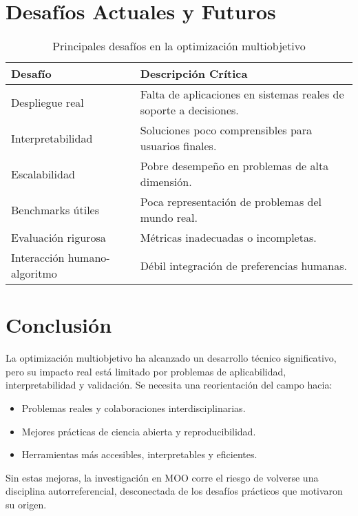 \documentclass[12pt]{article}
\begin{document}
\section*{Desafíos Actuales y Futuros}

\begin{table}[h!]
\centering
\begin{tabular}{@{}ll@{}}
\toprule
\textbf{Desafío} & \textbf{Descripción Crítica} \\
\midrule
Despliegue real & Falta de aplicaciones en sistemas reales de soporte a decisiones. \\
Interpretabilidad & Soluciones poco comprensibles para usuarios finales. \\
Escalabilidad & Pobre desempeño en problemas de alta dimensión. \\
Benchmarks útiles & Poca representación de problemas del mundo real. \\
Evaluación rigurosa & Métricas inadecuadas o incompletas. \\
Interacción humano-algoritmo & Débil integración de preferencias humanas. \\
\bottomrule
\end{tabular}
\caption{Principales desafíos en la optimización multiobjetivo}
\end{table}

\section*{Conclusión}

La optimización multiobjetivo ha alcanzado un desarrollo técnico significativo, pero su impacto real está limitado por problemas de aplicabilidad, interpretabilidad y validación. Se necesita una reorientación del campo hacia:

\begin{itemize}
    \item Problemas reales y colaboraciones interdisciplinarias.
    \item Mejores prácticas de ciencia abierta y reproducibilidad.
    \item Herramientas más accesibles, interpretables y eficientes.
\end{itemize}

Sin estas mejoras, la investigación en MOO corre el riesgo de volverse una disciplina autorreferencial, desconectada de los desafíos prácticos que motivaron su origen.
\end{document}

